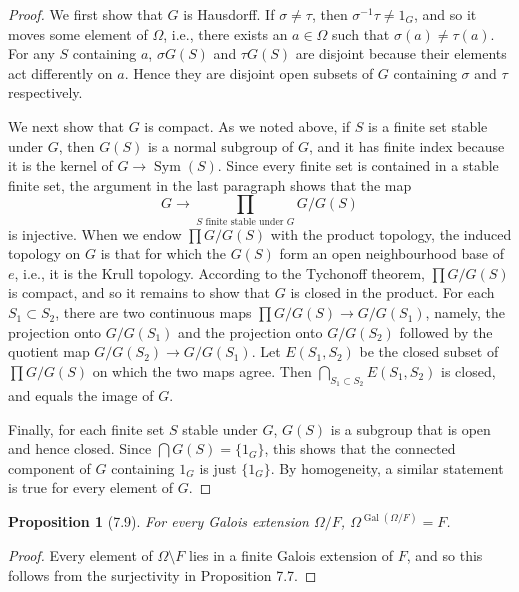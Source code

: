 \documentclass[UTF8,11pt]{ctexart}
\newtheorem*{proposition}{Proposition}
\theoremstyle{definition}
\begin{document}
\begin{proof}
We first show that $G$ is Hausdorff. If $\sigma\ne\tau$, then $\sigma^{-1}\tau\ne1_G$, and so it moves some element of $\Omega$, i.e., there exists an $a\in\Omega$ such that $\sigma(a)\ne\tau(a)$. For any $S$ containing $a$, $\sigma G(S)$ and $\tau G(S)$ are disjoint because their elements act differently on $a$. Hence they are disjoint open subsets of $G$ containing $\sigma$ and $\tau$ respectively.

We next show that $G$ is compact. As we noted above, if $S$ is a finite set stable under $G$, then $G(S)$ is a normal subgroup of $G$, and it has finite index because it is the kernel of $G\to\operatorname{Sym}(S)$. Since every finite set is contained in a stable finite set, the argument in the last paragraph shows that the map
\[
G\longrightarrow\prod_{S\text{ finite stable under }G}G/G(S)
\]
is injective. When we endow $\prod G/G(S)$ with the product topology, the induced topology on $G$ is that for which the $G(S)$ form an open neighbourhood base of $e$, i.e., it is the Krull topology. According to the Tychonoff theorem, $\prod G/G(S)$ is compact, and so it remains to show that $G$ is closed in the product. For each $S_1\subset S_2$, there are two continuous maps $\prod G/G(S)\to G/G(S_1)$, namely, the projection onto $G/G(S_1)$ and the projection onto $G/G(S_2)$ followed by the quotient map $G/G(S_2)\to G/G(S_1)$. Let $E(S_1,S_2)$ be the closed subset of $\prod G/G(S)$ on which the two maps agree. Then $\bigcap_{S_1\subset S_2}E(S_1,S_2)$ is closed, and equals the image of $G$.

Finally, for each finite set $S$ stable under $G$, $G(S)$ is a subgroup that is open and hence closed. Since $\bigcap G(S)=\{1_G\}$, this shows that the connected component of $G$ containing $1_G$ is just $\{1_G\}$. By homogeneity, a similar statement is true for every element of $G$.
\end{proof}
\begin{proposition}[7.9]
For every Galois extension $\Omega/F$, $\Omega^{\operatorname{Gal}(\Omega/F)}=F$.
\end{proposition}
\begin{proof}
Every element of $\Omega\setminus F$ lies in a finite Galois extension of $F$, and so this follows from the surjectivity in Proposition 7.7.
\end{proof}
\end{document}
